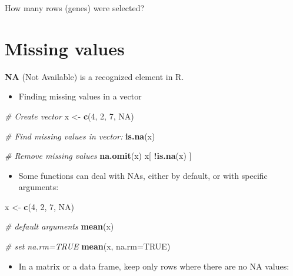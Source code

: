 \documentclass[]{book}
\newenvironment{Shaded}{\begin{snugshade}}{\end{snugshade}}
\newcommand{\CommentTok}[1]{\textcolor[rgb]{0.56,0.35,0.01}{\textit{#1}}}
\newcommand{\DataTypeTok}[1]{\textcolor[rgb]{0.13,0.29,0.53}{#1}}
\newcommand{\DecValTok}[1]{\textcolor[rgb]{0.00,0.00,0.81}{#1}}
\newcommand{\KeywordTok}[1]{\textcolor[rgb]{0.13,0.29,0.53}{\textbf{#1}}}
\newcommand{\NormalTok}[1]{#1}
\newcommand{\OperatorTok}[1]{\textcolor[rgb]{0.81,0.36,0.00}{\textbf{#1}}}
\newcommand{\OtherTok}[1]{\textcolor[rgb]{0.56,0.35,0.01}{#1}}
\newcommand{\StringTok}[1]{\textcolor[rgb]{0.31,0.60,0.02}{#1}}
\providecommand{\tightlist}{%
  \setlength{\itemsep}{0pt}\setlength{\parskip}{0pt}}
\begin{document}
How many rows (genes) were selected?

\hypertarget{missing-values}{%
\chapter{Missing values}\label{missing-values}}

\textbf{NA} (Not Available) is a recognized element in R.

\begin{itemize}
\tightlist
\item
  Finding missing values in a vector
\end{itemize}

\begin{Shaded}
\begin{Highlighting}[]
\CommentTok{# Create vector}
\NormalTok{x <-}\StringTok{ }\KeywordTok{c}\NormalTok{(}\DecValTok{4}\NormalTok{, }\DecValTok{2}\NormalTok{, }\DecValTok{7}\NormalTok{, }\OtherTok{NA}\NormalTok{)}

\CommentTok{# Find missing values in vector:}
\KeywordTok{is.na}\NormalTok{(x)}

\CommentTok{# Remove missing values}
\KeywordTok{na.omit}\NormalTok{(x)}
\NormalTok{x[ }\OperatorTok{!}\KeywordTok{is.na}\NormalTok{(x) ]}
\end{Highlighting}
\end{Shaded}

\begin{itemize}
\tightlist
\item
  Some functions can deal with NAs, either by default, or with specific arguments:
\end{itemize}

\begin{Shaded}
\begin{Highlighting}[]
\NormalTok{x <-}\StringTok{ }\KeywordTok{c}\NormalTok{(}\DecValTok{4}\NormalTok{, }\DecValTok{2}\NormalTok{, }\DecValTok{7}\NormalTok{, }\OtherTok{NA}\NormalTok{)}

\CommentTok{# default arguments}
\KeywordTok{mean}\NormalTok{(x)}

\CommentTok{# set na.rm=TRUE}
\KeywordTok{mean}\NormalTok{(x, }\DataTypeTok{na.rm=}\OtherTok{TRUE}\NormalTok{)}
\end{Highlighting}
\end{Shaded}

\begin{itemize}
\tightlist
\item
  In a matrix or a data frame, keep only rows where there are no NA values:
\end{itemize}
\end{document}
